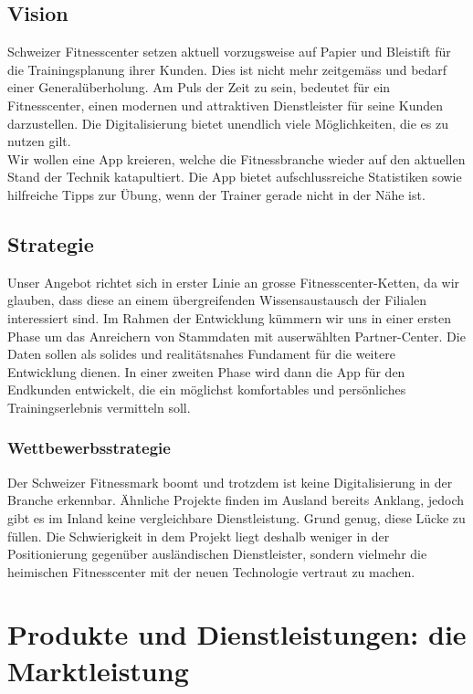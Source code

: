 \subsection{Vision}
Schweizer Fitnesscenter setzen aktuell vorzugsweise auf Papier und Bleistift für die Trainingsplanung ihrer Kunden. Dies ist nicht mehr zeitgemäss und bedarf einer Generalüberholung. Am Puls der Zeit zu sein, bedeutet für ein Fitnesscenter, einen modernen und attraktiven Dienstleister für seine Kunden darzustellen. Die Digitalisierung bietet unendlich viele Möglichkeiten, die es zu nutzen gilt. \\
Wir wollen eine App kreieren, welche die Fitnessbranche wieder auf den aktuellen Stand der Technik katapultiert. Die App bietet aufschlussreiche Statistiken sowie hilfreiche Tipps zur Übung, wenn der Trainer gerade nicht in der Nähe ist.

\subsection{Strategie}
Unser Angebot richtet sich in erster Linie an grosse Fitnesscenter-Ketten, da wir glauben, dass diese an einem übergreifenden Wissensaustausch der Filialen interessiert sind. Im Rahmen der Entwicklung kümmern wir uns in einer ersten Phase um das Anreichern von Stammdaten mit auserwählten Partner-Center. Die Daten sollen als solides und realitätsnahes Fundament für die weitere Entwicklung dienen. In einer zweiten Phase wird dann die App für den Endkunden entwickelt, die ein möglichst komfortables und persönliches Trainingserlebnis vermitteln soll. 

\subsubsection{Wettbewerbsstrategie}
Der Schweizer Fitnessmark boomt und trotzdem ist keine Digitalisierung in der Branche erkennbar. Ähnliche Projekte finden im Ausland bereits Anklang, jedoch gibt es im Inland keine vergleichbare Dienstleistung. Grund genug, diese Lücke zu füllen. Die Schwierigkeit in dem Projekt liegt deshalb weniger in der Positionierung gegenüber ausländischen Dienstleister, sondern vielmehr die heimischen Fitnesscenter mit der neuen Technologie vertraut zu machen.


\section{Produkte und Dienstleistungen: die Marktleistung}

